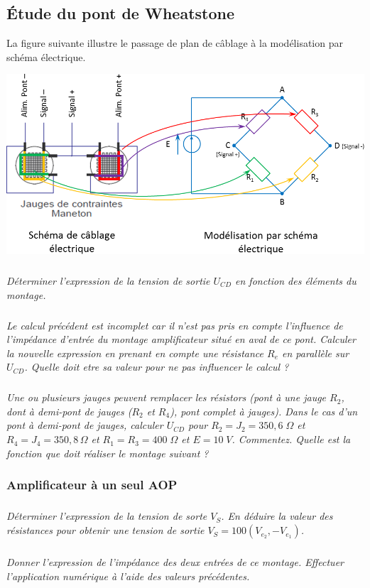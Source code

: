 \documentclass[10pt]{article}
\begin{document}
\subsection*{Étude du pont de Wheatstone}

La figure suivante illustre le passage de plan de câblage à la modélisation par schéma électrique. 

\begin{center}
\includegraphics[width=.75\textwidth]{images/cablage}
\end{center}


\subparagraph{}
\textit{Déterminer l'expression de la tension de sortie $U_{CD}$ en fonction des éléments du montage.}


\subparagraph{}
\textit{Le calcul précédent est incomplet car il n'est pas pris en compte l'influence de l'impédance d'entrée du montage amplificateur situé en aval de ce pont. Calculer la nouvelle expression en prenant en compte une résistance $R_e$ en parallèle sur $U_{CD}$. Quelle doit etre sa valeur pour ne pas influencer le calcul ? }

\subparagraph{}
\textit{Une ou plusieurs jauges peuvent remplacer les résistors (pont à une jauge $R_2$, dont à demi-pont de jauges ($R_2$ et $R_4$), pont complet à jauges). Dans le cas d'un pont à demi-pont de jauges, calculer $U_{CD}$ pour $R_2 = J_2 = 350,6\; \Omega$ et $R_4 = J_4 = 350,8 \, \Omega$ et $R_1=R_3=400\; \Omega$ et $E=10\; V$. Commentez. Quelle est la fonction que doit réaliser le montage suivant ?}


\subsubsection*{Amplificateur à un seul AOP}
\subparagraph{}
\textit{Déterminer l'expression de la tension de sorte $V_S$. En déduire la valeur des résistances pour obtenir une tension de sortie $V_S = 100 \left( V_{e_2}, - V_{e_1}\right)$.}

\subparagraph{}
\textit{Donner l'expression de l'impédance des deux entrées de ce montage. Effectuer l'application numérique à l'aide des valeurs précédentes. }
\end{document}
